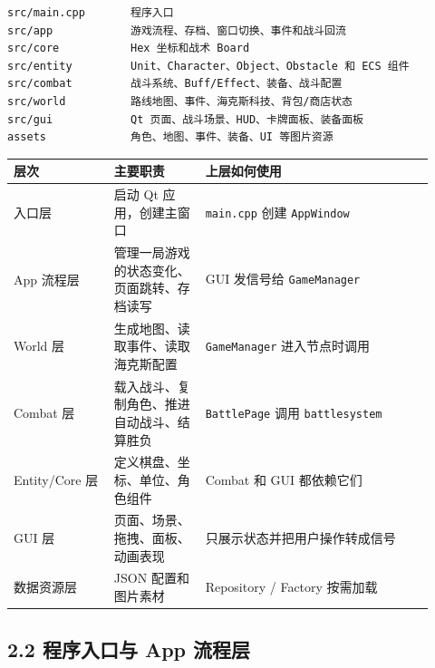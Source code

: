 \documentclass[UTF8,10pt]{ctexart}
\begin{document}
\begin{lstlisting}
src/main.cpp       程序入口
src/app            游戏流程、存档、窗口切换、事件和战斗回流
src/core           Hex 坐标和战术 Board
src/entity         Unit、Character、Object、Obstacle 和 ECS 组件
src/combat         战斗系统、Buff/Effect、装备、战斗配置
src/world          路线地图、事件、海克斯科技、背包/商店状态
src/gui            Qt 页面、战斗场景、HUD、卡牌面板、装备面板
assets             角色、地图、事件、装备、UI 等图片资源
\end{lstlisting}

{\small
\begin{longtable}{p{0.22\linewidth}p{0.20\linewidth}p{0.50\linewidth}}
\toprule
\textbf{层次} & \textbf{主要职责} & \textbf{上层如何使用} \\
\midrule
入口层 & 启动 Qt 应用，创建主窗口 & \texttt{main.\allowbreak{}cpp} 创建 \texttt{AppWindow} \\
App 流程层 & 管理一局游戏的状态变化、页面跳转、存档读写 & GUI 发信号给 \texttt{GameManager} \\
World 层 & 生成地图、读取事件、读取海克斯配置 & \texttt{GameManager} 进入节点时调用 \\
Combat 层 & 载入战斗、复制角色、推进自动战斗、结算胜负 & \texttt{BattlePage} 调用 \texttt{battlesystem} \\
Entity/Core 层 & 定义棋盘、坐标、单位、角色组件 & Combat 和 GUI 都依赖它们 \\
GUI 层 & 页面、场景、拖拽、面板、动画表现 & 只展示状态并把用户操作转成信号 \\
数据资源层 & JSON 配置和图片素材 & Repository / Factory 按需加载 \\
\bottomrule
\end{longtable}
}

\subsection*{2.2 程序入口与 App 流程层}
\end{document}
